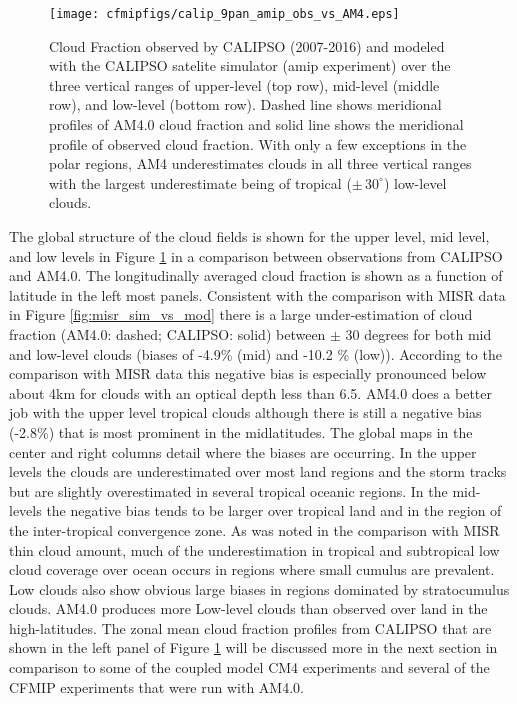 \documentclass[draft]{agujournal2019}
\begin{document}
\begin{figure}
  \centering
  \texttt{[image: cfmipfigs/calip\_9pan\_amip\_obs\_vs\_AM4.eps]}
  \caption{Cloud Fraction observed by CALIPSO (2007-2016) and modeled with the CALIPSO satelite simulator 
  (amip experiment) over the three vertical ranges of upper-level (top row), mid-level (middle row), 
  and low-level (bottom row).
  Dashed line shows meridional profiles of AM4.0 cloud fraction and solid line shows
  the meridional profile of observed cloud fraction.  With only a few exceptions in the polar regions, AM4 underestimates
  clouds in all three vertical ranges with the largest underestimate being of tropical ($\pm \, 30^\circ$) low-level clouds.}
  \label{fig:calipso_9pan}
\end{figure}

The global structure of the cloud fields is shown for the upper level, mid level, and low levels in 
Figure \ref{fig:calipso_9pan} in a comparison between observations from CALIPSO and AM4.0.
The longitudinally averaged cloud fraction is shown as a function of latitude in the left most panels.  
Consistent with the comparison with MISR data in Figure \ref{fig:misr_sim_vs_mod} there is a large under-estimation 
of cloud fraction (AM4.0: dashed; CALIPSO: solid) between 
$\pm$ 30 degrees for both mid and low-level clouds (biases of -4.9\% (mid) and -10.2 \% (low)). 
According to the comparison with MISR data this negative bias is especially pronounced below about 4km
for clouds with an optical depth less than 6.5.    
AM4.0 does a better job with the upper level tropical clouds although there is still a negative bias (-2.8\%) 
that is most prominent in the midlatitudes.   
The global maps  in the center and right columns detail where the biases are occurring.  
In the upper levels the clouds are underestimated over most land regions and the storm tracks but are 
slightly overestimated in several tropical oceanic regions.  In the mid-levels the negative bias tends to be larger 
over tropical land and in the region of the inter-tropical convergence zone.  
As was noted in the comparison with MISR thin cloud amount, much of the underestimation in tropical and subtropical low
cloud coverage over ocean occurs in regions where small cumulus are prevalent.  Low clouds also show obvious large biases in 
regions dominated by stratocumulus clouds.
AM4.0 produces more Low-level clouds than observed over land in the high-latitudes.  
The zonal mean cloud fraction profiles from CALIPSO that are shown in the left panel of  Figure \ref{fig:calipso_9pan}
will be discussed more in the next section in comparison to some of the coupled model CM4 experiments and
several of the CFMIP experiments that were run with AM4.0.  
\end{document}
